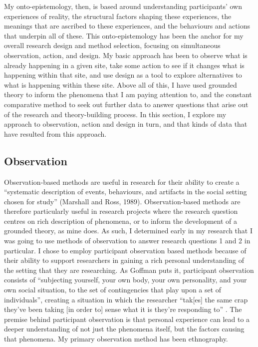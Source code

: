 My onto-epistemology, then, is based around understanding participants' own experiences of reality, the structural factors shaping these experiences, the meanings that are ascribed to these experiences, and the behaviours and actions that underpin all of these. This onto-epistemology has been the anchor for my overall research design and method selection, focusing on simultaneous observation, action, and design. My basic approach has been to observe what is already happening in a given site, take some action to see if it changes what is happening within that site, and use design as a tool to explore alternatives to what is happening within these site. Above all of this, I have used grounded theory to inform the phenomena that I am paying attention to, and the constant comparative method to seek out further data to answer questions that arise out of the research and theory-building process. In this section, I explore my approach to observation, action and design in turn, and that kinds of data that have resulted from this approach. 

\subsection{Observation}
\label{3-observation}

Observation-based methods are useful in research for their ability to create a “systematic description of events, behaviours, and artifacts in the social setting chosen for study” (Marshall and Ross, 1989). Observation-based methods are therefore particularly useful in research projects where the research question centres on rich description of phenomena, or to inform the development of a grounded theory, as mine does. As such, I determined early in my research that I was going to use methods of observation to answer research questions 1 and 2 in particular. I chose to employ participant observation based methods because of their ability to support researchers in gaining a rich personal understanding of the setting that they are researching. As Goffman puts it, participant observation consists of “subjecting yourself, your own body, your own personality, and your own social situation, to the set of contingencies that play upon a set of individuals”, creating a situation in which the researcher “tak[es] the same crap they’ve been taking [in order to] sense what it is they’re responding to”  \cite{goffman_fieldwork_1989}. The premise behind participant observation is that personal experience can lead to a deeper understanding of not just the phenomena itself, but the factors causing that phenomena. My primary observation method has been ethnography. 


